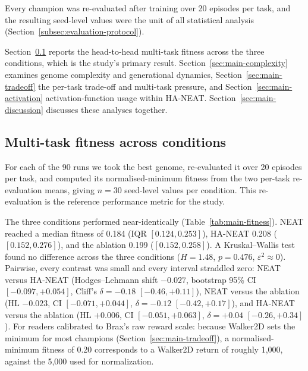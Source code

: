 \documentclass[12pt]{article}
\begin{document}
Every champion was re-evaluated after training over 20 episodes per task, and the resulting seed-level values were the unit of all statistical analysis (Section~\ref{subsec:evaluation-protocol}).

Section~\ref{sec:main-study} reports the head-to-head multi-task fitness across the three conditions, which is the study's primary result.
Section~\ref{sec:main-complexity} examines genome complexity and generational dynamics, Section~\ref{sec:main-tradeoff} the per-task trade-off and multi-task pressure, and Section~\ref{sec:main-activation} activation-function usage within HA-NEAT.
Section~\ref{sec:main-discussion} discusses these analyses together.

\subsection{Multi-task fitness across conditions}
\label{sec:main-study}
For each of the 90 runs we took the best genome, re-evaluated it over 20 episodes per task, and computed its normalised-minimum fitness from the two per-task re-evaluation means, giving $n = 30$ seed-level values per condition.
This re-evaluation is the reference performance metric for the study.

The three conditions performed near-identically (Table~\ref{tab:main-fitness}).
NEAT reached a median fitness of 0.184 (IQR $[0.124, 0.253]$), HA-NEAT 0.208 ($[0.152, 0.276]$), and the ablation 0.199 ($[0.152, 0.258]$).
A Kruskal--Wallis test found no difference across the three conditions ($H = 1.48$, $p = 0.476$, $\varepsilon^2 \approx 0$).
Pairwise, every contrast was small and every interval straddled zero: NEAT versus HA-NEAT (Hodges--Lehmann shift $-0.027$, bootstrap 95\% CI $[-0.097, +0.054]$, Cliff's $\delta = -0.18$ $[-0.46, +0.11]$), NEAT versus the ablation (HL $-0.023$, CI $[-0.071, +0.044]$, $\delta = -0.12$ $[-0.42, +0.17]$), and HA-NEAT versus the ablation (HL $+0.006$, CI $[-0.051, +0.063]$, $\delta = +0.04$ $[-0.26, +0.34]$).
For readers calibrated to Brax's raw reward scale: because Walker2D sets the minimum for most champions (Section~\ref{sec:main-tradeoff}), a normalised-minimum fitness of 0.20 corresponds to a Walker2D return of roughly 1{,}000, against the 5{,}000 used for normalization.
\end{document}
